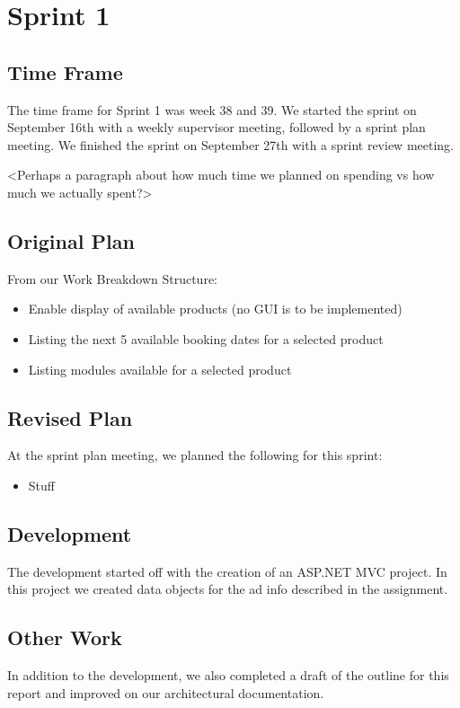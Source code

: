 \section{Sprint 1}

\subsection{Time Frame}
The time frame for Sprint 1 was week 38 and 39. We started the sprint on September 16th with a weekly supervisor meeting, followed by a sprint plan meeting. We finished the sprint on September 27th with a sprint review meeting.

<Perhaps a paragraph about how much time we planned on spending vs how much we actually spent?>

\subsection{Original Plan}
From our Work Breakdown Structure:
\begin{itemize}
	\item Enable display of available products (no GUI is to be implemented)
	\item Listing the next 5 available booking dates for a selected product
	\item Listing modules available for a selected product
\end{itemize}

\subsection{Revised Plan}
At the sprint plan meeting, we planned the following for this sprint:
\begin{itemize}
	\item Stuff
\end{itemize}

\subsection{Development}
The development started off with the creation of an ASP.NET MVC project. In this project we created data objects for the ad info described in the assignment.

\subsection{Other Work}
In addition to the development, we also completed a draft of the outline for this report and improved on our architectural documentation.

